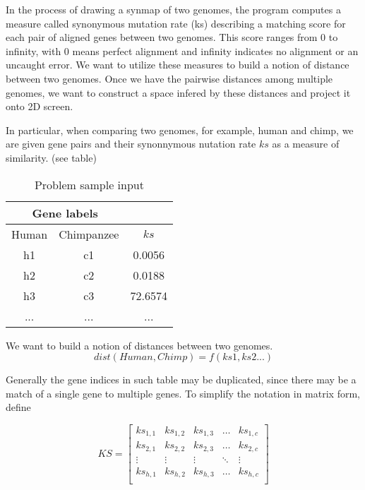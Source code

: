 \documentclass[12pt]{article}
\begin{document}

In the process of drawing a synmap of two genomes, the program computes a measure called synonymous mutation rate (ks) describing a matching score for each pair of aligned genes between two genomes. This score ranges from 0 to infinity, with 0 means perfect alignment and infinity indicates no alignment or an uncaught error. We want to utilize these measures to build a notion of distance between two genomes. Once we have the pairwise distances among multiple genomes, we want to construct a space infered by these distances and project it onto 2D screen.



In particular, when comparing two genomes, for example, human and chimp, we are given gene pairs and their synonnymous nutation rate $ks$ as a measure of similarity. (see table)

\begin{table}[h!]
\centering
\caption{Problem sample input}
\label{tab:table1}
\begin{tabular}{cc|c}
\toprule
\multicolumn{2}{c}{Gene labels} &\\
\midrule
Human & Chimpanzee & $ks$\\
\midrule
h1 & c1 & 0.0056\\
h2 & c2 & 0.0188\\
h3 & c3	 & 72.6574\\
... & ... & ...	\\
\bottomrule
\end{tabular}
\end{table}

We want to build a notion of distances between two genomes.
$$dist(Human, Chimp) = f(ks1,ks2...)$$

Generally the gene indices in such table may be duplicated, since there may be a match of a single gene to multiple genes. To simplify the notation in matrix form, define


$$KS = 
\begin{bmatrix}
ks_{1,1} & ks_{1,2} & ks_{1,3} & \dots & ks_{1, c}\\
ks_{2,1} & ks_{2,2} & ks_{2,3} & \dots & ks_{2, c}\\
\vdots & \vdots & \vdots & \ddots & \vdots \\
ks_{h,1} & ks_{h,2} & ks_{h,3} & \dots & ks_{h, c}\\
\end{bmatrix}
$$
\end{document}

